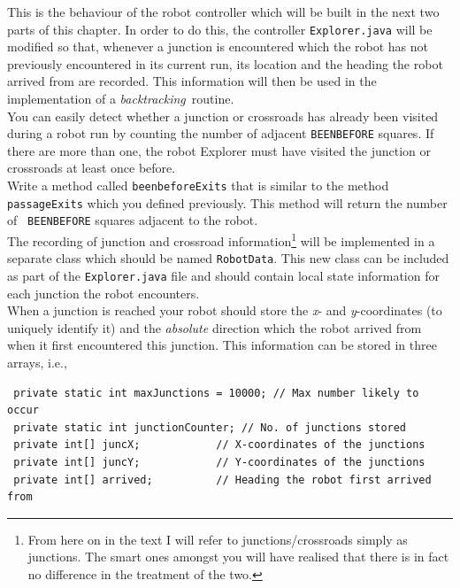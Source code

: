 \noindent
This is the behaviour of the robot controller which will be built in the
next two parts of this chapter. In order to do this,
the controller {\tt Explorer.java} will be modified so that, whenever
a junction is encountered which the robot has not previously encountered in its
current run, its location and the heading the robot arrived from are
recorded. This information will then be used in the implementation of a
{\it backtracking}~routine. \\

 You can easily detect whether a
junction or crossroads has already been visited during a robot run
by counting the number of adjacent {\tt BEENBEFORE} squares. If
there are more than one, the robot Explorer must have
visited the junction or crossroads at least once before. \\

\noindent Write a method called {\tt beenbeforeExits} that is
similar to the method {\tt passageExits} which you defined 
previously. This method will return the number of {\tt
BEENBEFORE} squares adjacent to the robot. \\

 The recording of junction and
crossroad information\footnote{From here on in the text I will
refer to junctions/crossroads simply as junctions. The smart
ones amongst you will have realised that there is in fact no
difference in the treatment of the two.} will be implemented in a
separate class which should be named {\tt RobotData}. This new
class can be included as part of the {\tt Explorer.java} file and
should contain local state
information for each junction the robot encounters. \\

\noindent When a junction is reached your robot should store the
{\it x}- and {\it y}-coordinates (to uniquely identify it) and the
{\it absolute} direction which the robot arrived from when it first encountered
this junction. This information can be stored in three arrays, i.e., 

\begin{verbatim}
 private static int maxJunctions = 10000; // Max number likely to occur
 private static int junctionCounter; // No. of junctions stored  
 private int[] juncX;            // X-coordinates of the junctions
 private int[] juncY;            // Y-coordinates of the junctions
 private int[] arrived;          // Heading the robot first arrived from
\end{verbatim}

